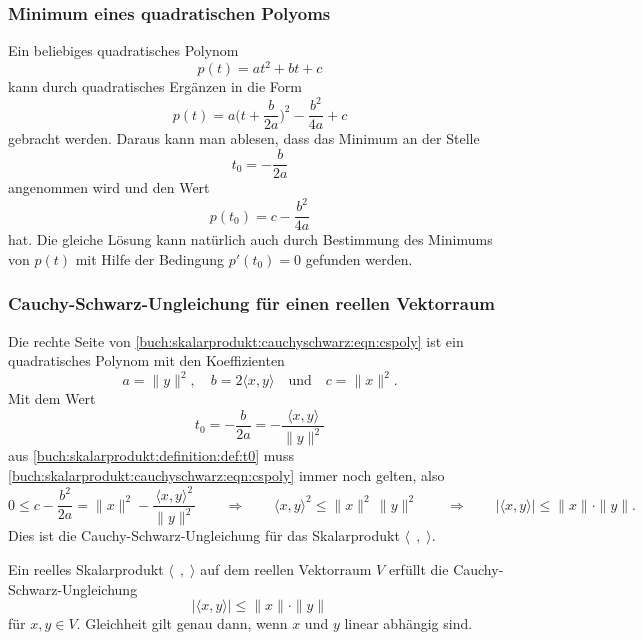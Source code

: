 %
%
\subsubsection{Minimum eines quadratischen Polyoms}
Ein beliebiges quadratisches Polynom
\[
p(t)=at^2+bt+c
\]
kann durch
quadratisches Ergänzen in die Form
\[
p(t)
=
a\biggl(t+\frac{b}{2a}\biggr)^2 -\frac{b^2}{4a}+c
\]
gebracht werden.
Daraus kann man ablesen, dass das Minimum an der Stelle
\begin{equation}
t_0
=
-\frac{b}{2a}
\label{buch:skalarprodukt:definition:def:t0}
\end{equation}
angenommen wird und den Wert 
\begin{equation}
p(t_0)
=
c-\frac{b^2}{4a}
\end{equation}
hat.
Die gleiche Lösung kann natürlich auch durch Bestimmung des Minimums
von $p(t)$ mit Hilfe der Bedingung $p'(t_0)=0$ gefunden werden.

%
%
\subsubsection{Cauchy-Schwarz-Ungleichung für einen reellen Vektorraum}
Die rechte Seite von
\eqref{buch:skalarprodukt:cauchyschwarz:eqn:cspoly}
ist ein quadratisches Polynom mit den Koeffizienten
\[
a=\|y\|^2,\quad
b=2\langle x,y\rangle
\quad\text{und}\quad
c=\|x\|^2.
\]
Mit dem Wert
\[
t_0
=
-\frac{b}{2a}
=
-\frac{\langle x,y\rangle}{\|y\|^2}
\]
aus \eqref{buch:skalarprodukt:definition:def:t0} muss
\eqref{buch:skalarprodukt:cauchyschwarz:eqn:cspoly}
immer noch gelten, also
\[
0
\le
c-\frac{b^2}{2a}
=
\|x\|^2 - \frac{\langle x,y\rangle^2}{\|y\|^2}
\qquad\Rightarrow\qquad
\langle x,y\rangle^2 \le \|x\|^2\, \|y\|^2
\qquad\Rightarrow\qquad
|\langle x,y\rangle| \le \|x\|\cdot \|y\|.
\]
Dies ist die Cauchy-Schwarz-Ungleichung für das Skalarprodukt
$\langle \;\,,\;\rangle$.

\begin{satz}
\label{buch:skalarprodukt:cauchy-schwarz:satz:reell}
Ein reelles Skalarprodukt $\langle\;\,,\;\rangle$ auf dem reellen Vektorraum
$V$ erfüllt die Cauchy-Schwarz-Ungleichung
\begin{equation}
|\langle x, y\rangle| \le \|x\|\cdot\|y\|
\label{buch:skalarprodukt:cauchyschwarz:eqn:ungleichung}
\end{equation}
für $x,y\in V$.
Gleichheit gilt genau dann, wenn $x$ und $y$ linear abhängig sind.
\end{satz}

